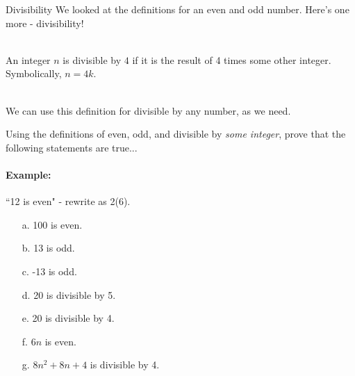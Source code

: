 
        \begin{intro}{Divisibility}
            We looked at the definitions for an even and odd number.
            Here's one more - divisibility!

            ~\\
            An integer $n$ is divisible by $4$ if it is the result of
            4 times some other integer. Symbolically, $n = 4k$.

            ~\\
            We can use this definition for divisible by any number, as we
            need.
        \end{intro}

    \newpage

        \begin{questionNOGRADE}{\thequestion}
            Using the definitions of even, odd, and divisible by \textit{some integer},
            prove that the following statements are true...

            \paragraph{Example:} ``12 is even" - rewrite as 2(6).

            \begin{enumerate}
                \item[a.] 100 is even.

                \item[b.] 13 is odd.

                \item[c.] -13 is odd.

                \item[d.] 20 is divisible by 5.

                \item[e.] 20 is divisible by 4.

                \item[f.] $6n$ is even.

                \item[g.] $8n^{2} + 8n + 4$ is divisible by 4.

            \end{enumerate}
        \end{questionNOGRADE}

